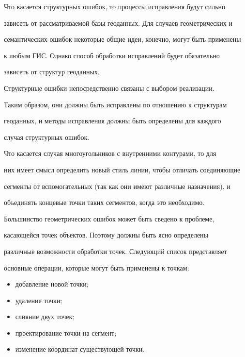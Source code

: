     


    Что касается структурных ошибок, то процессы исправления будут сильно 


зависеть от рассматриваемой базы геоданных. Для случаев геометрических и 


семантических ошибок некоторые общие идеи, конечно, могут быть применены 


к любым ГИС. Однако способ обработки исправлений будет обязательно 


зависеть от структур геоданных. 


    


    Структурные ошибки непосредственно связаны с выбором реализации. 


Таким образом, они должны быть исправлены по отношению к структурам 


геоданных, и методы исправления должны быть определены для каждого 


случая структурных ошибок. 


    


    Что касается случая многоугольников с внутренними контурами, то для 


них имеет смысл определить новый стиль линии, чтобы отличать соединяющие 


сегменты от вспомогательных (так как они имеют различные назначения), и 


объединять концевые точки таких сегментов, когда это необходимо. 


    


    Большинство геометрических ошибок может быть сведено к проблеме, 


касающейся точек объектов. Поэтому должны быть ясно определены 


различные возможности обработки точек. Следующий список представляет 


основные операции, которые могут быть применены к точкам: 


    \begin{itemize}


\item добавление новой точки; 


\item удаление точки; 


\item слияние двух точек; 


\item проектирование точки на сегмент; 


\item изменение координат существующей точки. 


\end{itemize}





